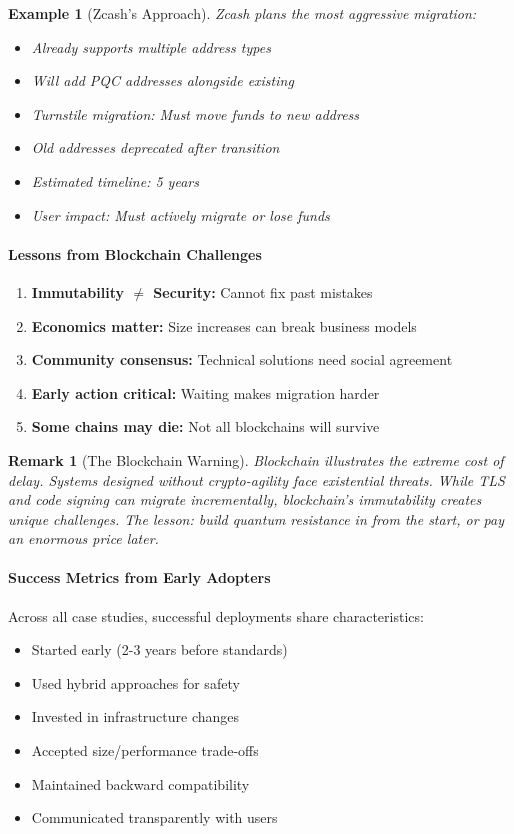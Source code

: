 \documentclass[11pt,a4paper]{article}
\newtheorem{example}{Example}
\newtheorem{remark}{Remark}
\begin{document}
\begin{example}[Zcash's Approach]
Zcash plans the most aggressive migration:
\begin{itemize}
    \item Already supports multiple address types
    \item Will add PQC addresses alongside existing
    \item Turnstile migration: Must move funds to new address
    \item Old addresses deprecated after transition
    \item Estimated timeline: 5 years
    \item User impact: Must actively migrate or lose funds
\end{itemize}
\end{example}

\paragraph{Lessons from Blockchain Challenges}

\begin{enumerate}
    \item \textbf{Immutability $\neq$ Security:} Cannot fix past mistakes
    \item \textbf{Economics matter:} Size increases can break business models
    \item \textbf{Community consensus:} Technical solutions need social agreement
    \item \textbf{Early action critical:} Waiting makes migration harder
    \item \textbf{Some chains may die:} Not all blockchains will survive
\end{enumerate}

\begin{remark}[The Blockchain Warning]
Blockchain illustrates the extreme cost of delay. Systems designed without crypto-agility face existential threats. While TLS and code signing can migrate incrementally, blockchain's immutability creates unique challenges. The lesson: build quantum resistance in from the start, or pay an enormous price later.
\end{remark}

\paragraph{Success Metrics from Early Adopters}

Across all case studies, successful deployments share characteristics:
\begin{itemize}
    \item Started early (2-3 years before standards)
    \item Used hybrid approaches for safety
    \item Invested in infrastructure changes
    \item Accepted size/performance trade-offs
    \item Maintained backward compatibility
    \item Communicated transparently with users
\end{itemize}
\end{document}
